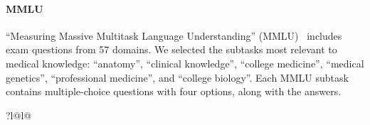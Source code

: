 \documentclass[10pt, letter, onecolumn]{arxiv}
\begin{document}
\begin{refsection}
\paragraph{MMLU} ``Measuring Massive Multitask Language Understanding'' (MMLU)~\cite{hendrycks2020measuring} includes exam questions from 57 domains. We selected the subtasks most relevant to medical knowledge: ``anatomy'', ``clinical knowledge'', ``college medicine'', ``medical genetics'', ``professional medicine'', and ``college biology''. Each MMLU subtask contains multiple-choice questions with four options, along with the answers. 

\begin{table}[h]
\small
\centering
{}
\label{tab:mmlu-examples}
\begin{tabular}{?l@{\hspace{.1em}}l@{\hspace{0.1em}}}

 \\\toprule

 \\ \\


\end{tabular}
\end{table}
\end{refsection}
\end{document}
